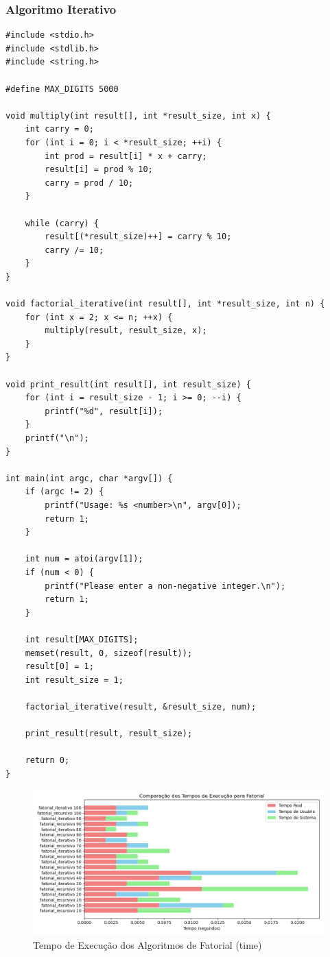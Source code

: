 \documentclass[12pt]{article}
\begin{document}
\subsubsection{Algoritmo Iterativo}
\begin{verbatim}
#include <stdio.h>
#include <stdlib.h>
#include <string.h>

#define MAX_DIGITS 5000

void multiply(int result[], int *result_size, int x) {
    int carry = 0;
    for (int i = 0; i < *result_size; ++i) {
        int prod = result[i] * x + carry;
        result[i] = prod % 10;
        carry = prod / 10;
    }

    while (carry) {
        result[(*result_size)++] = carry % 10;
        carry /= 10;
    }
}

void factorial_iterative(int result[], int *result_size, int n) {
    for (int x = 2; x <= n; ++x) {
        multiply(result, result_size, x);
    }
}

void print_result(int result[], int result_size) {
    for (int i = result_size - 1; i >= 0; --i) {
        printf("%d", result[i]);
    }
    printf("\n");
}

int main(int argc, char *argv[]) {
    if (argc != 2) {
        printf("Usage: %s <number>\n", argv[0]);
        return 1;
    }

    int num = atoi(argv[1]);
    if (num < 0) {
        printf("Please enter a non-negative integer.\n");
        return 1;
    }

    int result[MAX_DIGITS];
    memset(result, 0, sizeof(result));
    result[0] = 1;
    int result_size = 1;

    factorial_iterative(result, &result_size, num);

    print_result(result, result_size);

    return 0;
}
\end{verbatim}

\begin{figure}[H]
    \centering
    \includegraphics[width=\linewidth]{./resultados/time_fatorial.png}
    \caption{Tempo de Execução dos Algoritmos de Fatorial (time)}
    \label{fig:time_fatorial}
\end{figure}
\end{document}
